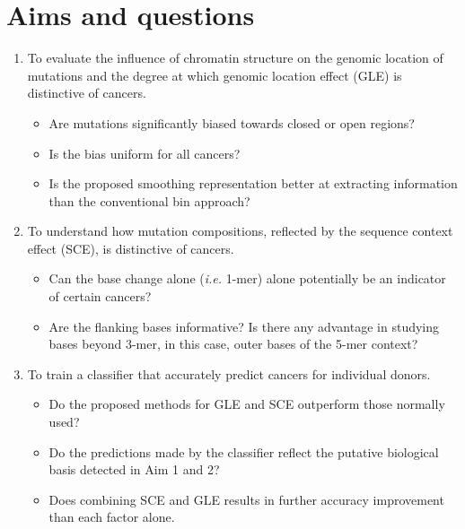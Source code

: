 \section{Aims and questions}
\label{intro:aims}
\begin{enumerate}
    \item To evaluate the influence of chromatin structure on the genomic location of mutations and the degree at which genomic location effect (GLE) is distinctive of cancers.
    \begin{itemize}
        \item Are mutations significantly biased towards closed or open regions?
        \item Is the bias uniform for all cancers?
        \item Is the proposed smoothing representation better at extracting information than the conventional bin approach?
    \end{itemize}
    \item To understand how mutation compositions, reflected by the sequence context effect (SCE), is distinctive of cancers.
    \begin{itemize}
        \item Can the base change alone (\textit{i.e.} 1-mer) alone potentially be an indicator of certain cancers?
        \item Are the flanking bases informative? Is there any advantage in studying bases beyond 3-mer, in this case, outer bases of the 5-mer context?
    \end{itemize}
    \item To train a classifier that accurately predict cancers for individual donors.
    \begin{itemize}
        \item Do the proposed methods for GLE and SCE outperform those normally used?
        \item Do the predictions made by the classifier reflect the putative biological basis detected in Aim 1 and 2?
        \item Does combining SCE and GLE results in further accuracy improvement than each factor alone.
    \end{itemize}
\end{enumerate}

